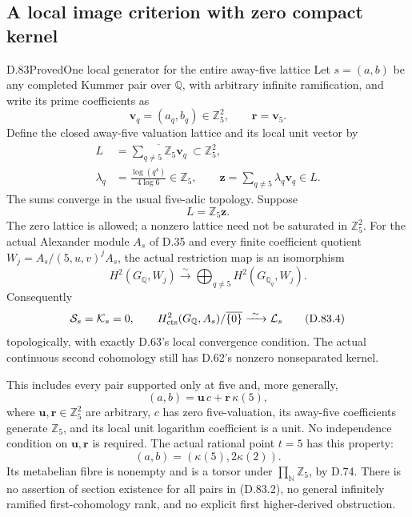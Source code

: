 \subsection{A local image criterion with zero compact kernel}

\begin{statement}{D.83}{Proved}{One local generator for the entire away-five lattice}
Let \(s=(a,b)\) be any completed Kummer pair over \(\mathbb Q\),
with arbitrary infinite ramification, and write its prime coefficients as
\[
 \mathbf v_q=(a_q,b_q)\in\mathbb Z_5^2,
 \qquad \mathbf r=\mathbf v_5.
\]
Define the closed away-five valuation lattice and its local unit vector by
\[
 \begin{split}
 L&=\overline{\sum_{q\ne5}\mathbb Z_5\mathbf v_q}
                                      \ \subset\mathbb Z_5^2,\\
 \lambda_q&=\frac{\log(q^4)}{4\log6}\in\mathbb Z_5,
 \qquad
 \mathbf z=\sum_{q\ne5}\lambda_q\mathbf v_q\in L.
 \end{split}                                                   \tag{D.83.1}
\]
The sums converge in the usual five-adic topology. Suppose
\[
                           L=\mathbb Z_5\mathbf z.              \tag{D.83.2}
\]
The zero lattice is allowed; a nonzero lattice need not be
saturated in \(\mathbb Z_5^2\). For the actual Alexander module
\(A_s\) of D.35 and every finite coefficient quotient
\(W_j=A_s/(5,u,v)^jA_s\), the actual restriction map is an
isomorphism
\[
 H^2(G_{\mathbb Q},W_j)
       \xrightarrow{\ \sim\ }
       \bigoplus_{q\ne5}H^2(G_{\mathbb Q_q},W_j).                 \tag{D.83.3}
\]
Consequently
\[
 \mathcal S_s=\mathcal K_s=0,
 \qquad
 H^2_{\rm cts}(G_{\mathbb Q},A_s)/\overline{\{0\}}
       \xrightarrow{\ \sim\ }\mathcal L_s                       \tag{D.83.4}
\]
topologically, with exactly D.63's local convergence condition.
The actual continuous second cohomology still has D.62's
nonzero nonseparated kernel.

This includes every pair supported only at five and, more generally,
\[
 (a,b)=\mathbf u\,c+\mathbf r\,\kappa(5),                         \tag{D.83.5}
\]
where \(\mathbf u,\mathbf r\in\mathbb Z_5^2\) are arbitrary,
\(c\) has zero five-valuation, its away-five coefficients generate
\(\mathbb Z_5\), and its local unit logarithm coefficient is a unit.
No independence condition on \(\mathbf u,\mathbf r\) is required.
The actual rational point \(t=5\) has this property:
\[
                  (a,b)=(\kappa(5),2\kappa(2)).                  \tag{D.83.6}
\]
Its metabelian fibre is nonempty and is a torsor under
\(\prod_{\mathbb N}\mathbb Z_5\), by D.74.
There is no assertion of section existence for all pairs in
(D.83.2), no general infinitely ramified first-cohomology rank,
and no explicit first higher-derived obstruction.
\end{statement}


